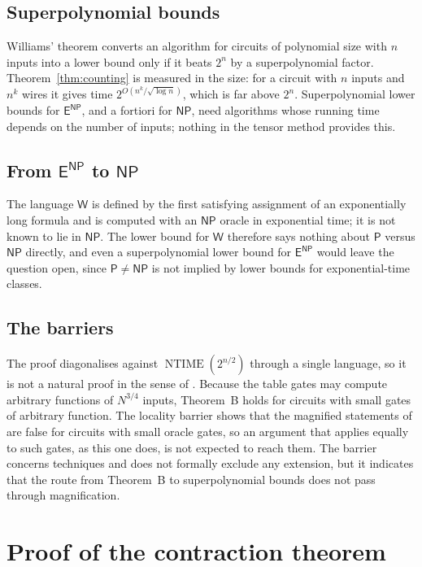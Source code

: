 \documentclass[11pt,reqno]{amsart}
\numberwithin{equation}{section}
\theoremstyle{plain}
\theoremstyle{definition}
\theoremstyle{remark}
\DeclareMathOperator{\NTIME}{NTIME}
\newcommand{\Pc}{\mathsf{P}}
\newcommand{\NP}{\mathsf{NP}}
\newcommand{\ENP}{\mathsf{E}^{\mathsf{NP}}}
\newcommand{\Wl}{\mathsf{W}}
\begin{document}
\subsection{Superpolynomial bounds}
Williams' theorem \cite{Wil13} converts an algorithm for circuits of polynomial
size with $n$ inputs into a lower bound only if it beats $2^n$ by a
superpolynomial factor. Theorem~\ref{thm:counting} is measured in the size: for
a circuit with $n$ inputs and $n^k$ wires it gives time $2^{O(n^k/\sqrt{\log
n})}$, which is far above $2^n$. Superpolynomial lower bounds for $\ENP$, and a
fortiori for $\NP$, need algorithms whose running time depends on the number of
inputs; nothing in the tensor method provides this.

\subsection{From $\ENP$ to $\NP$}
The language $\Wl$ is defined by the first satisfying assignment of an
exponentially long formula and is computed with an $\NP$ oracle in exponential
time; it is not known to lie in $\NP$. The lower bound for
$\Wl$ therefore says nothing about $\Pc$ versus $\NP$ directly, and even a
superpolynomial lower bound for $\ENP$ would leave the question open, since
$\Pc\ne\NP$ is not implied by lower bounds for exponential-time classes.

\subsection{The barriers}
The proof diagonalises against $\NTIME(2^{n/2})$ through a single language, so
it is not a natural proof in the sense of \cite{RR97}. Because the table gates
may compute arbitrary functions of $N^{3/4}$ inputs, Theorem~B holds for circuits
with small gates of arbitrary function. The locality barrier \cite{CHOPRS22}
shows that the magnified statements of \cite{OS18} are false for circuits with
small oracle gates, so an argument that applies equally to such gates, as this
one does, is not expected to reach them. The barrier concerns techniques and
does not formally exclude any extension, but it indicates that the route from
Theorem~B to superpolynomial bounds does not pass through magnification.

\appendix

\section{Proof of the contraction theorem}\label{app:contraction}
\end{document}

